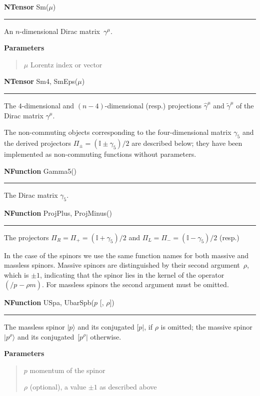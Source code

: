 \documentclass[preprint,number,12pt,sort&compress]{elsarticle}
\newcommand{\fmslash}[1]{\ensuremath{/\!\!\!{#1}}}
\newcommand{\pslash}[1][{}]{\fmslash{p}_{#1}}
\newcommand{\brb}[1]{[ #1 \vert}
\newcommand{\kea}[1]{\vert #1 \rangle}
\newcommand{\One}{{\mathbb{I}}}
\newlength{\funcindent}
\newlength{\funcwidth}
\newenvironment{Ventry}[1]%
 {\begin{list}{}{%
   \renewcommand{\makelabel}[1]{\texttt{##1:}\hfil}%
   \settowidth{\labelwidth}{\texttt{#1:}}%
   \setlength{\leftmargin}{\labelsep}%
   \addtolength{\leftmargin}{\labelwidth}}}%
 {\end{list}}
\newenvironment{NFunction}[2]{%
\hspace{.8\funcindent}\begin{boxedminipage}{\funcwidth}
	\raggedright \textbf{NFunction} #1(#2)

	\vspace{-1.5ex}

	\rule{\textwidth}{0.5\fboxrule}
	\setlength{\parskip}{2ex}
}{\end{boxedminipage}}
\newenvironment{NTensor}[2]{%
\hspace{.8\funcindent}\begin{boxedminipage}{\funcwidth}
	\raggedright \textbf{NTensor} #1(#2)

	\vspace{-1.5ex}

	\rule{\textwidth}{0.5\fboxrule}
	\setlength{\parskip}{2ex}
}{\end{boxedminipage}}
\newenvironment{Parameters}{%
	\setlength{\parskip}{1ex}
	\textbf{Parameters}
	\vspace{-1ex}
	\begin{quote}}{%
	\end{quote}}
\begin{document}
\medskip
\begin{NTensor}{Sm}{$\mu$}
	An $n$-dimensional Dirac matrix~$\gamma^\mu$.

	\begin{Parameters}
		\begin{Ventry}{$\mu$}
			\item[$\mu$] Lorentz index or vector
		\end{Ventry}
	\end{Parameters}
\end{NTensor}

\medskip
\begin{NTensor}{Sm4, SmEps}{$\mu$}
	The $4$-dimensional and $(n-4)$-dimensional (resp.) projections
	$\hat{\gamma}^\mu$ and $\tilde{\gamma}^\mu$
	of the Dirac matrix $\gamma^\mu$.
\end{NTensor}

\medskip
The non-commuting objects corresponding to the four-dimensional
matrix $\gamma_5$ and the derived projectors $\Pi_\pm=(\One\pm\gamma_5)/2$
are described below; they have been implemented as non-commuting functions
without parameters.

\medskip
\begin{NFunction}{Gamma5}{}
   The Dirac matrix $\gamma_5$.
\end{NFunction}

\medskip
\begin{NFunction}{ProjPlus, ProjMinus}{}
   The projectors $\Pi_R=\Pi_+=(\One+\gamma_5)/2$ and
	$\Pi_L=\Pi_-=(\One-\gamma_5)/2$ (resp.)
\end{NFunction}

\medskip
In the case of the spinors we use the same function names for both massive
and massless spinors. Massive spinors are distinguished by their second
argument~$\rho$, which is $\pm1$, indicating that the spinor lies in the
kernel of the operator $(\pslash-\rho m)$. For massless spinors the second
argument must be omitted.

\medskip
\begin{NFunction}{USpa, UbarSpb}{$p$ [, $\rho$]}
   The massless spinor $\kea{p}$ and its conjugated $\brb{p}$,
	if $\rho$ is omitted;
	the massive spinor~$\kea{p^\rho}$ and its conjugated~$\brb{p^\rho}$
	otherwise.

	\begin{Parameters}
		\begin{Ventry}{$\rho$}
			\item[$p$] momentum of the spinor
			\item[$\rho$] (optional), a value $\pm1$ as described above
		\end{Ventry}
	\end{Parameters}
\end{NFunction}
\end{document}
